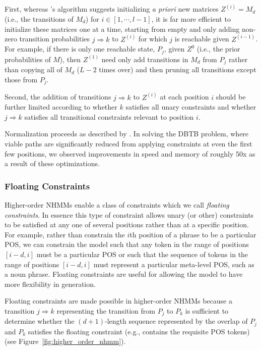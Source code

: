 \documentclass[phd,electronic,oneside,twosidetoc,letterpaper,chaptercenter,parttop,lol,lof,lot]{byumsphd}
\begin{document}
First, whereas \citeauthor{pachet2011finite}'s algorithm suggests initializing \textit{a priori} new matrices $Z^{(i)} = M_d$ (i.e., the transitions of $M_d$) for $i \in [1,\cdots,l-1]$, it is far more efficient to initialize these matrices one at a time, starting from empty and only adding non-zero transition probabilities $j \Rightarrow k$ to $Z^{(i)}$ for which $j$ is reachable given $Z^{(i-1)}$. For example, if there is only one reachable state, $P_j$, given $Z^0$ (i.e., the prior probabilities of $M$), then $Z^{(1)}$ need only add transitions in $M_d$ from $P_j$ rather than copying all of $M_d$ ($L-2$ times over) and then pruning all transitions except those from $P_j$. 

Second, the addition of transitions $j \Rightarrow k$ to $Z^{(i)}$ at each position $i$ should be further limited according to whether $k$ satisfies all unary constraints and whether $j \Rightarrow k$ satisfies all transitional constraints relevant to position $i$. 

Normalization proceeds as described by \citeauthor{pachet2011finite}. In solving the DBTB problem, where viable paths are significantly reduced from applying constraints at even the first few positions, we observed improvements in speed and memory of roughly 50x as a result of these optimizations.

\subsubsection{Floating Constraints}

Higher-order NHMMs enable a class of constraints which we call \textit{floating constraints}. In essence this type of constraint allows unary (or other) constraints to be satisfied at any one of several positions rather than at a specific position. For example, rather than constrain the $i$th position of a phrase to be a particular POS, we can constrain the model such that any token in the range of positions $[i-d,i]$ must be a particular POS or such that the sequence of tokens in the range of positions $[i-d,i]$ must represent a particular meta-level POS, such as a noun phrase. Floating constraints are useful for allowing the model to have more flexibility in generation.

Floating constraints are made possible in higher-order NHMMs because a transition $j \Rightarrow k$ representing the transition from $P_j$ to $P_k$ is sufficient to determine whether the $(d+1)$-length sequence represented by the overlap of $P_j$ and $P_k$ satisfies the floating constraint (e.g., contains the requisite POS tokens)(see Figure~\ref{fig:higher_order_nhmm}).
\end{document}
